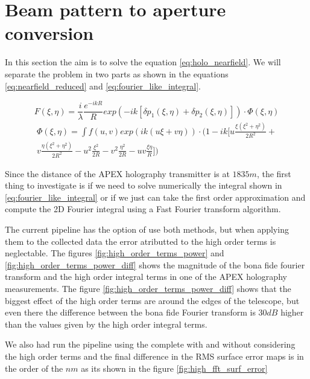 \section{Beam pattern to aperture conversion}

In this section the aim is to solve the equation \ref{eq:holo_nearfield}. We will separate the problem in two parts as shown in the equations \ref{eq:nearfield_reduced} and \ref{eq:fourier_like_integral}.


\begin{equation}
    \label{eq:nearfield_reduced}
    F(\xi, \eta) = \frac{i}{\lambda}\frac{e^{-ikR}}{R} exp\left(-ik[\delta p_1(\xi,\eta)+\delta p_2(\xi, \eta)]\right) \cdot \Phi(\xi, \eta)
\end{equation}
\begin{equation}
    \label{eq:fourier_like_integral}
    \begin{split}
        \Phi(\xi, \eta) = \int f(u,v)exp\left(ik(u\xi+v\eta)\right) \cdot \Biggl(1-ik\biggl[ u \frac{\xi(\xi^2+\eta^2)}{2R^2} + \\
        v \frac{\eta(\xi^2 +\eta^2)}{2R^2}-u^2\frac{\xi^2}{2R}-v^2\frac{\eta^2}{2R}-uv\frac{\xi\eta}{R} \biggr] \Biggr)
    \end{split}
\end{equation}

Since the distance of the APEX holography transmitter is at $1835m$, the first thing to investigate is if we need to solve numerically the integral shown in \ref{eq:fourier_like_integral} or if we just can take the first order approximation and compute the 2D Fourier integral using a Fast Fourier transform algorithm.


The current pipeline has the option of use both methods, but when applying them to the collected data the error atributted to the high order terms is neglectable. The figures \ref{fig:high_order_terms_power} and \ref{fig:high_order_terms_power_diff} shows the magnitude of the bona fide fourier transform and the high order integral terms in one of the APEX holography measurements. The figure \ref{fig:high_order_terms_power_diff} shows that the biggest effect of the high order terms are around the edges of the telescope, but even there the difference between the bona fide Fourier transform is $30dB$ higher than the values given by the high order integral terms.


We also had run the pipeline using the complete with and without considering the high order terms and the final difference in the RMS surface error maps is in the order of the $nm$ as its shown in the figure \ref{fig:high_fft_surf_error}


